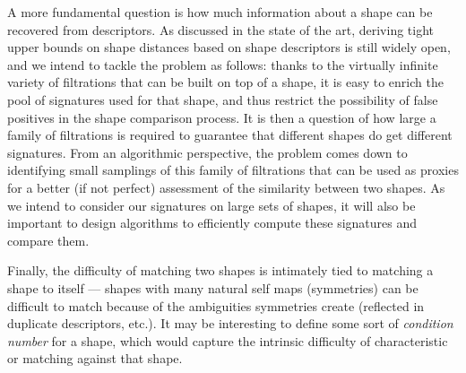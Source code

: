 A more fundamental question is how much information about a shape can
be recovered from descriptors. As discussed in the state of the art,
deriving tight upper bounds on shape distances based on shape descriptors is
still widely open, and we intend to tackle the problem as
follows: thanks to the virtually infinite variety of filtrations that
can be built on top of a shape, it is easy to enrich the pool of
signatures used for that shape, and thus restrict the possibility of
false positives in the shape comparison process. It is then a question
of how large a family of filtrations is required to guarantee that
different shapes do get different signatures. From an algorithmic
perspective, the problem comes down to identifying small samplings of this
family of filtrations that can be used as proxies for a better (if not
perfect) assessment of the similarity between two shapes.  As we
intend to consider our signatures on large sets of shapes, it will
also be important to design algorithms to efficiently compute these
signatures and compare them.%

Finally, the difficulty of matching two shapes is
intimately tied to matching a shape to itself --- shapes with many
natural self maps (symmetries) can be difficult to match because of
the ambiguities symmetries create (reflected in duplicate descriptors,
etc.). It may be interesting to define some sort of {\em condition
  number} for a shape, which would capture the intrinsic difficulty of
characteristic or matching against that shape.



